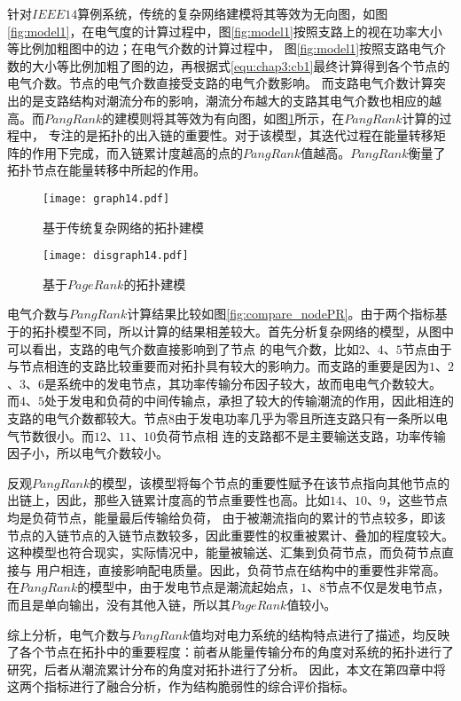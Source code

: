 针对$IEEE14$算例系统，传统的复杂网络建模将其等效为无向图，如图\ref{fig:model1}，在电气度的计算过程中，图\ref{fig:model1}按照支路上的视在功率大小等比例加粗图中的边；在电气介数的计算过程中，
图\ref{fig:model1}按照支路电气介数的大小等比例加粗了图的边，再根据式\ref{equ:chap3:cb1}最终计算得到各个节点的电气介数。节点的电气介数直接受支路的电气介数影响。
而支路电气介数计算突出的是支路结构对潮流分布的影响，潮流分布越大的支路其电气介数也相应的越高。而$PangRank$的建模则将其等效为有向图，如图\ref{fig:model2}所示，在$PangRank$计算的过程中，
专注的是拓扑的出入链的重要性。对于该模型，其迭代过程在能量转移矩阵的作用下完成，而入链累计度越高的点的$PangRank$值越高。$PangRank$衡量了拓扑节点在能量转移中所起的作用。
\begin{figure}[H]
\begin{minipage}{0.48\textwidth}
  \centering
  \texttt{[image: graph14.pdf]}
  \caption{基于传统复杂网络的拓扑建模}
  \label{fig:model1}
\end{minipage}\hfill
\begin{minipage}{0.48\textwidth}
  \centering
  \texttt{[image: disgraph14.pdf]}
  \caption{基于$PageRank$的拓扑建模}
  \label{fig:model2}
\end{minipage}
\end{figure}
电气介数与$PangRank$计算结果比较如图\ref{fig:compare_nodePR}。由于两个指标基于的拓扑模型不同，所以计算的结果相差较大。首先分析复杂网络的模型，从图中可以看出，支路的电气介数直接影响到了节点
的电气介数，比如$2$、$4$、$5$节点由于与节点相连的支路比较重要而对拓扑具有较大的影响力。而支路的重要是因为$1$、$2$、$3$、$6$是系统中的发电节点，其功率传输分布因子较大，故而电电气介数较大。
而$4$、$5$处于发电和负荷的中间传输点，承担了较大的传输潮流的作用，因此相连的支路的电气介数都较大。节点$8$由于发电功率几乎为零且所连支路只有一条所以电气节数很小。而$12$、$11$、$10$负荷节点相
连的支路都不是主要输送支路，功率传输因子小，所以电气介数较小。

反观$PangRank$的模型，该模型将每个节点的重要性赋予在该节点指向其他节点的出链上，因此，那些入链累计度高的节点重要性也高。比如$14$、$10$、$9$，这些节点均是负荷节点，能量最后传输给负荷，
由于被潮流指向的累计的节点较多，即该节点的入链节点的入链节点数较多，因此重要性的权重被累计、叠加的程度较大。这种模型也符合现实，实际情况中，能量被输送、汇集到负荷节点，而负荷节点直接与
用户相连，直接影响配电质量。因此，负荷节点在结构中的重要性非常高。在$PangRank$的模型中，由于发电节点是潮流起始点，$1$、$8$节点不仅是发电节点，而且是单向输出，没有其他入链，所以其$PageRank$值较小。

综上分析，电气介数与$PangRank$值均对电力系统的结构特点进行了描述，均反映了各个节点在拓扑中的重要程度：前者从能量传输分布的角度对系统的拓扑进行了研究，后者从潮流累计分布的角度对拓扑进行了分析。
因此，本文在第四章中将这两个指标进行了融合分析，作为结构脆弱性的综合评价指标。

